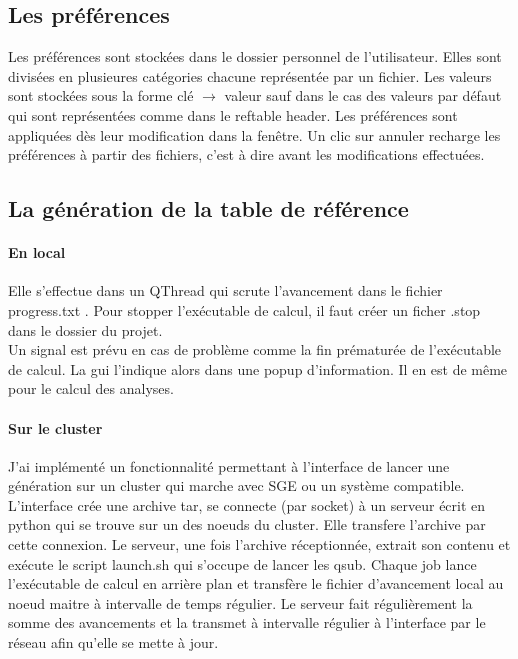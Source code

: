 \documentclass[12pt,a4paper]{article}
\begin{document}
    \subsection{Les préférences}
        Les préférences sont stockées dans le dossier personnel de
        l'utilisateur. Elles sont divisées en plusieures catégories chacune
        représentée par un fichier. Les valeurs sont stockées sous la forme clé
        $\rightarrow$ valeur sauf dans le cas des valeurs par défaut qui sont
        représentées comme dans le reftable header. Les préférences sont
        appliquées dès leur modification dans la fenêtre. Un clic sur annuler
        recharge les préférences à partir des fichiers, c'est à dire avant les
        modifications effectuées.
        

    \subsection{La génération de la table de référence}
        \paragraph{En local}
        Elle s'effectue dans un QThread qui scrute l'avancement dans le fichier
        progress.txt . Pour stopper l'exécutable de calcul, il faut créer un
        ficher .stop dans le dossier du projet.\\

        Un signal est prévu en cas de problème comme la fin prématurée de
        l'exécutable de calcul. La gui l'indique alors dans une popup
        d'information.  Il en est de même pour le calcul des analyses.


        \paragraph{Sur le cluster}
        J'ai implémenté un fonctionnalité permettant à l'interface de lancer une
        génération sur un cluster qui marche avec SGE ou un système compatible.
        L'interface crée une archive tar, se connecte (par socket) à un serveur
        écrit en python qui se trouve sur un des noeuds du cluster. Elle
        transfere l'archive par cette connexion.  Le serveur, une fois
        l'archive réceptionnée, extrait son contenu et exécute le script
        launch.sh qui s'occupe de lancer les qsub. Chaque job lance l'exécutable
        de calcul en arrière plan et transfère le fichier d'avancement local au
        noeud maitre à intervalle de temps régulier. Le serveur fait
        régulièrement la somme des avancements et la transmet à intervalle
        régulier à l'interface par le réseau afin qu'elle se mette à jour.
\end{document}
